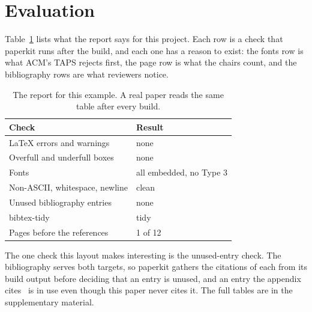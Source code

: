 \section{Evaluation}
\label{sec:evaluation}

Table~\ref{tab:checks} lists what the report says for this project. Each row
is a check that paperkit runs after the build, and each one has a reason to
exist: the fonts row is what ACM's TAPS rejects first, the page row is what
the chairs count, and the bibliography rows are what reviewers notice.

\begin{table}[t]
  \caption{The report for this example. A real paper reads the same table
  after every build.}
  \label{tab:checks}
  \begin{tabular}{ll}
    \toprule
    Check & Result \\
    \midrule
    LaTeX errors and warnings & none \\
    Overfull and underfull boxes & none \\
    Fonts & all embedded, no Type 3 \\
    Non-ASCII, whitespace, newline & clean \\
    Unused bibliography entries & none \\
    bibtex-tidy & tidy \\
    Pages before the references & 1 of 12 \\
    \bottomrule
  \end{tabular}
\end{table}

The one check this layout makes interesting is the unused-entry check. The
bibliography serves both targets, so paperkit gathers the citations of each
from its build output before deciding that an entry is unused, and an entry
the appendix cites~\cite{tlnet} is in use even though this paper never cites
it. The full tables are in the supplementary material.
